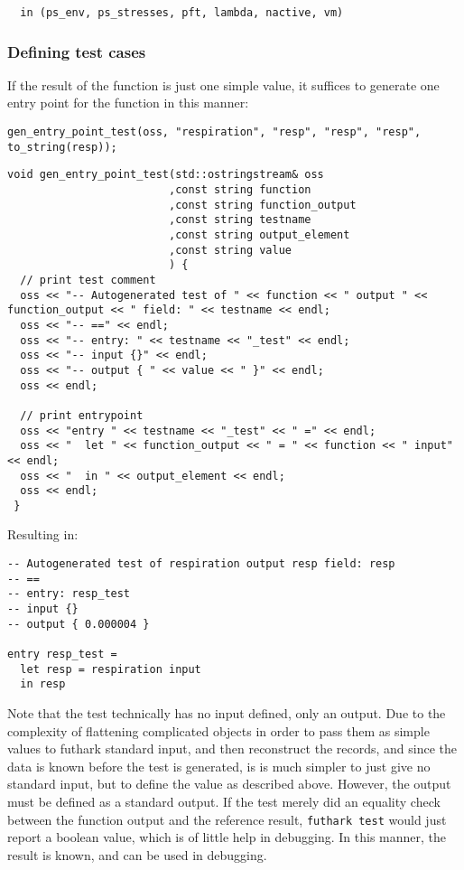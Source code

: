 \begin{verbatim}
  in (ps_env, ps_stresses, pft, lambda, nactive, vm)
\end{verbatim}


\subsubsection*{Defining test cases}
If the result of the function is just one simple value, it suffices to generate one entry point for the function in this manner:

\begin{verbatim}
gen_entry_point_test(oss, "respiration", "resp", "resp", "resp", to_string(resp));
\end{verbatim}

\begin{verbatim}
void gen_entry_point_test(std::ostringstream& oss
                         ,const string function
                         ,const string function_output
                         ,const string testname
                         ,const string output_element
                         ,const string value
                         ) {
  // print test comment
  oss << "-- Autogenerated test of " << function << " output " << function_output << " field: " << testname << endl;
  oss << "-- ==" << endl;
  oss << "-- entry: " << testname << "_test" << endl;
  oss << "-- input {}" << endl;
  oss << "-- output { " << value << " }" << endl;
  oss << endl;

  // print entrypoint
  oss << "entry " << testname << "_test" << " =" << endl;
  oss << "  let " << function_output << " = " << function << " input" << endl;
  oss << "  in " << output_element << endl;
  oss << endl;
 }
\end{verbatim}
Resulting in:
\begin{verbatim}
-- Autogenerated test of respiration output resp field: resp
-- ==
-- entry: resp_test
-- input {}
-- output { 0.000004 }

entry resp_test =
  let resp = respiration input
  in resp
\end{verbatim}

Note that the test technically has no input defined, only an output. Due to the complexity of flattening complicated objects in order to pass them as simple values to futhark standard input, and then reconstruct the records, and since the data is known before the test is generated, is is much simpler to just give no standard input, but to define the value as described above. However, the output must be defined as a standard output. If the test merely did an equality check between the function output and the reference result, \texttt{futhark test} would just report a boolean value, which is of little help in debugging. In this manner, the result is known, and can be used in debugging.

